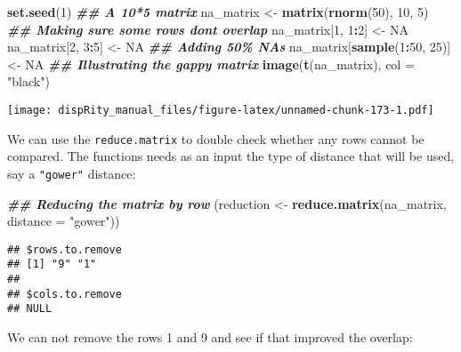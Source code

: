 \documentclass[
]{book}
\newenvironment{Shaded}{\begin{snugshade}}{\end{snugshade}}
\newcommand{\AttributeTok}[1]{\textcolor[rgb]{0.13,0.29,0.53}{#1}}
\newcommand{\ConstantTok}[1]{\textcolor[rgb]{0.56,0.35,0.01}{#1}}
\newcommand{\DecValTok}[1]{\textcolor[rgb]{0.00,0.00,0.81}{#1}}
\newcommand{\DocumentationTok}[1]{\textcolor[rgb]{0.56,0.35,0.01}{\textbf{\textit{#1}}}}
\newcommand{\FunctionTok}[1]{\textcolor[rgb]{0.13,0.29,0.53}{\textbf{#1}}}
\newcommand{\NormalTok}[1]{#1}
\newcommand{\OtherTok}[1]{\textcolor[rgb]{0.56,0.35,0.01}{#1}}
\newcommand{\SpecialCharTok}[1]{\textcolor[rgb]{0.81,0.36,0.00}{\textbf{#1}}}
\newcommand{\StringTok}[1]{\textcolor[rgb]{0.31,0.60,0.02}{#1}}
\begin{document}
\begin{Shaded}
\begin{Highlighting}[]
\FunctionTok{set.seed}\NormalTok{(}\DecValTok{1}\NormalTok{)}
\DocumentationTok{\#\# A 10*5 matrix}
\NormalTok{na\_matrix }\OtherTok{\textless{}{-}} \FunctionTok{matrix}\NormalTok{(}\FunctionTok{rnorm}\NormalTok{(}\DecValTok{50}\NormalTok{), }\DecValTok{10}\NormalTok{, }\DecValTok{5}\NormalTok{)}
\DocumentationTok{\#\# Making sure some rows don\textquotesingle{}t overlap}
\NormalTok{na\_matrix[}\DecValTok{1}\NormalTok{, }\DecValTok{1}\SpecialCharTok{:}\DecValTok{2}\NormalTok{] }\OtherTok{\textless{}{-}} \ConstantTok{NA}
\NormalTok{na\_matrix[}\DecValTok{2}\NormalTok{, }\DecValTok{3}\SpecialCharTok{:}\DecValTok{5}\NormalTok{] }\OtherTok{\textless{}{-}} \ConstantTok{NA}
\DocumentationTok{\#\# Adding 50\% NAs}
\NormalTok{na\_matrix[}\FunctionTok{sample}\NormalTok{(}\DecValTok{1}\SpecialCharTok{:}\DecValTok{50}\NormalTok{, }\DecValTok{25}\NormalTok{)] }\OtherTok{\textless{}{-}} \ConstantTok{NA}
\DocumentationTok{\#\# Illustrating the gappy matrix}
\FunctionTok{image}\NormalTok{(}\FunctionTok{t}\NormalTok{(na\_matrix), }\AttributeTok{col =} \StringTok{"black"}\NormalTok{)}
\end{Highlighting}
\end{Shaded}

\texttt{[image: dispRity\_manual\_files/figure-latex/unnamed-chunk-173-1.pdf]}

We can use the \texttt{reduce.matrix} to double check whether any rows cannot be compared.
The functions needs as an input the type of distance that will be used, say a \texttt{"gower"} distance:

\begin{Shaded}
\begin{Highlighting}[]
\DocumentationTok{\#\# Reducing the matrix by row}
\NormalTok{(reduction }\OtherTok{\textless{}{-}} \FunctionTok{reduce.matrix}\NormalTok{(na\_matrix, }\AttributeTok{distance =} \StringTok{"gower"}\NormalTok{))}
\end{Highlighting}
\end{Shaded}

\begin{verbatim}
## $rows.to.remove
## [1] "9" "1"
## 
## $cols.to.remove
## NULL
\end{verbatim}

We can not remove the rows 1 and 9 and see if that improved the overlap:

\begin{Shaded}
\end{Shaded}
\end{document}
